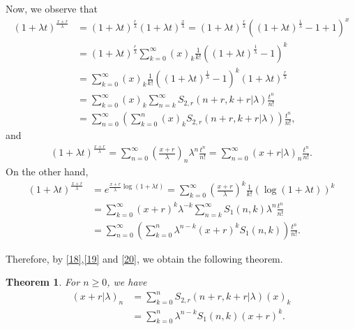 \documentclass[10pt,twoside,reqno]{amsart}
\numberwithin{equation}{section}
\newtheorem{thm}{\bf Theorem}[section]
\begin{document}
Now, we observe that
\begin{equation}\begin{split}\label{18}
(1+\lambda t)^{\frac{x+r}{\lambda }}& = (1+\lambda t)^{\frac{r}{\lambda }} (1+\lambda t)^{\frac{x}{\lambda }} = (1+\lambda t)^{\frac{r}{\lambda }} ((1+\lambda t)^{\frac{1}{\lambda }}-1+1)^x\\
&= (1+\lambda t)^{\frac{r}{\lambda }}\sum_{k=0}^\infty (x)_k \frac{1}{k!} ((1+\lambda t)^{\frac{1}{\lambda }}-1)^k\\
&= \sum_{k=0}^\infty (x)_k \frac{1}{k!} ((1+\lambda t)^{\frac{1}{\lambda }}-1)^k (1+\lambda t)^{\frac{r}{\lambda }} \\
&= \sum_{k=0}^\infty (x)_k \sum_{n=k}^\infty S_{2,r}(n+r,k+r|\lambda ) \frac{t^n}{n!}\\
&= \sum_{n=0}^\infty \left( \sum_{k=0}^n (x)_k S_{2,r}(n+r,k+r|\lambda ) \right) \frac{t^n}{n!},
\end{split}\end{equation}
and
\begin{equation}\begin{split}\label{19}
(1+\lambda t)^{\frac{x+r}{\lambda }} = \sum_{n=0}^\infty \left( \frac{x+r}{\lambda } \right)_n \lambda ^n \frac{t^n}{n!} = \sum_{n=0}^\infty (x+r|\lambda )_n \frac{t^n}{n!}.
\end{split}\end{equation}
On the other hand,
\begin{equation}\begin{split}\label{20}
(1+\lambda t)^{\frac{x+r}{\lambda }}&= e^{\frac{x+r}{\lambda }\log(1+\lambda t)} = \sum_{k=0}^\infty \left( \frac{x+r}{\lambda} \right)^k \frac{1}{k!} (\log(1+\lambda t))^k\\
&= \sum_{k=0}^\infty (x+r)^k \lambda ^{-k} \sum_{n=k}^\infty S_1(n,k) \lambda ^n \frac{t^n}{n!}\\
&= \sum_{n=0}^\infty \left( \sum_{k=0}^n \lambda ^{n-k} (x+r)^k S_1(n,k) \right) \frac{t^n}{n!}.
\end{split}\end{equation}

Therefore, by \eqref{18},\eqref{19} and \eqref{20}, we obtain the following theorem.

\begin{thm}
For $n \geq 0$, we have
\begin{equation*}\begin{split}
(x+r|\lambda )_n &= \sum_{k=0}^n S_{2,r}(n+r,k+r|\lambda )(x)_k\\
&= \sum_{k=0}^n \lambda ^{n-k} S_1(n,k) (x+r)^k.
\end{split}\end{equation*}
\end{thm}
\end{document}

